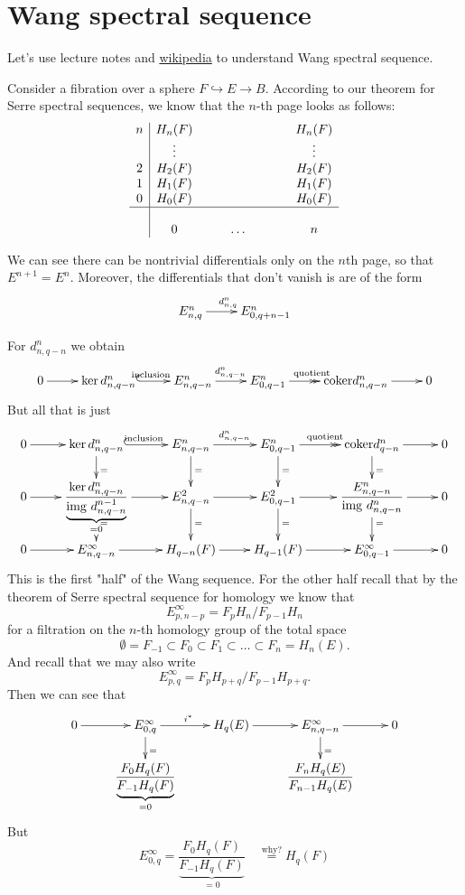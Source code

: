 \section{Wang spectral sequence}
\label{section-wang-spectral-sequence}

Let's use lecture notes and
\href{https://en.wikipedia.org/wiki/%
Spectral_sequence#Wang_sequence}{wikipedia}
to understand Wang spectral sequence.

Consider a fibration over a sphere
$F\hookrightarrow E\to B$. According to our
theorem for Serre spectral sequences, we know
that the $n$-th page looks as follows:
\begin{align*}
\begin{array}{c|cccccccc}
	n&H_n(F)&&&&&&&H_{n}(F)\\
	 &\vdots&&&&&&&\vdots\\
	2&H_2(F)&&&&&&&H_2(F)\\
	1&H_1(F)&&&&&&&H_1(F)\\
	0&H_0(F)&&&&&&&H_0(F)\\
	\hline\\
	 &0&&&\ldots&&&&n
\end{array}
\end{align*}

We can see there can be nontrivial
differentials only on the $n$th page, so that
$E^{n+1}=E^n$. Moreover, the differentials
that don't vanish is are of the form
$$
\xymatrix{
E^n_{n,q}\ar[r]^{d^n_{n,q}}&E^n_{0,q+n-1}
}
$$

For $d_{n,q-n}^n$ we obtain
$$
\xymatrix{
	0\ar[r]&\ker
	d^n_{n,q-n}\ar@{^{(}->}[r]^{\text{inclusion}
	}
	&E^n_{n,q-n}\ar[r]^{d^n_{n,q-n}}
	&E^n_{0,q-1}\ar@{->>}[r]^{\text{quotient}}
	&\text{coker}d^n_{n,q-n}\ar[r]&0
}
$$
But all that is just
$$
\xymatrix@R=1em{
	0\ar[r]&\ker
	d^n_{n,q-n}\ar@{^{(}->}[r]^{\text{inclusion}
	}
	\ar[d]^{=}
	&E^n_{n,q-n}\ar[r]^{d^n_{n,q-n}}\ar[d]^{=}
	&E^n_{0,q-1}\ar@{->>}[r]^{\text{quotient}}
	\ar[d]^{=}
	&\text{coker}d^n_{q-n}\ar[r]\ar[d]^{=}&0\\
	0\ar[r]&\dfrac{\ker
	d^n_{n,q-n}}{\underbrace{\text{img
	}d^{n-1}_{n,q-n}}_{=0}}
	\ar[r]\ar[d]^{=}
	&E^2_{n,q-n}\ar[r]\ar[d]^{=}
	&E^2_{0,q-1}\ar[r]\ar[d]^{=}
	&\dfrac{E^n_{n,q-n}}{\text{img }d^n_{n,q-n}}
	\ar[d]^{=}\ar[r]&0\\
	0\ar[r]&E^{\infty}_{n,q-n}\ar[r]&H_{q-n}(F)
	\ar[r]
	&H_{q-1}(F)\ar[r]&E^{\infty}_{0,q-1}\ar[r]&0
}
$$
This is the first "half" of the Wang
sequence. For the other half recall that by
the theorem of Serre spectral sequence for
homology we know that
$$E^{\infty}_{p,n-p}=F_pH_n/F_{p-1}H_n$$
for a filtration on the $n$-th homology group
of the total space
$$\emptyset=F_{-1}\subset F_0 \subset
F_1\subset \ldots\subset F_n=H_{n}(E).$$
And recall that we may also write
$$E^{\infty}_{p,q}=F_pH_{p+q}/F_{p-1}H_{p+q}.$$
Then we can see that
$$
\xymatrix@R=1em{
	0\ar[r]&E^{\infty}_{0,q}\ar[d]^{=}\ar[r]^{i^*}
	&H_{q}(E)\ar[r]&E^{\infty}_{n,q-n}\ar[r]\ar[d]
	^{=}
	&0\\
	&\dfrac{F_0H_{q}(F)}{\underbrace{F_{-1}H_{q}
	(F)}_{=0}}
	&&\dfrac{F_nH_{q}(E)}{F_{n-1}H_{q}(E)}
}
$$
But
$$E^{\infty}_{0,q}=\dfrac{F_0H_{q}(F)}
{\underbrace{F_{-1}H_{q}(F)}_{=0}}\quad
\overset{\text{why?}}{=}H_{q}(F)$$

